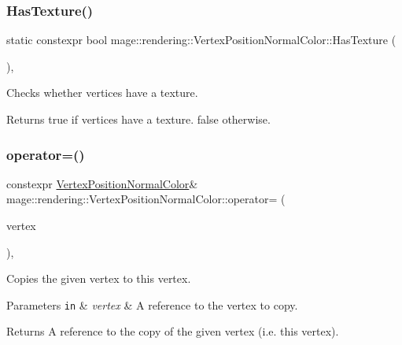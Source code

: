 \subsubsection{\texorpdfstring{Has\+Texture()}{HasTexture()}}
{\footnotesize\ttfamily static constexpr bool mage\+::rendering\+::\+Vertex\+Position\+Normal\+Color\+::\+Has\+Texture (\begin{DoxyParamCaption}{ }\end{DoxyParamCaption})\hspace{0.3cm}{\ttfamily [static]}, {\ttfamily [noexcept]}}

Checks whether vertices have a texture.

\begin{DoxyReturn}{Returns}
{\ttfamily true} if vertices have a texture. {\ttfamily false} otherwise. 
\end{DoxyReturn}
\mbox{\label{structmage_1_1rendering_1_1_vertex_position_normal_color_ae3bdf697f0dae8b01b43c6a8249ee817}} 
\subsubsection{\texorpdfstring{operator=()}{operator=()}\hspace{0.1cm}{\footnotesize\ttfamily [1/2]}}
{\footnotesize\ttfamily constexpr \mbox{\hyperlink{structmage_1_1rendering_1_1_vertex_position_normal_color}{Vertex\+Position\+Normal\+Color}}\& mage\+::rendering\+::\+Vertex\+Position\+Normal\+Color\+::operator= (\begin{DoxyParamCaption}\item[{const \mbox{\hyperlink{structmage_1_1rendering_1_1_vertex_position_normal_color}{Vertex\+Position\+Normal\+Color}} \&}]{vertex }\end{DoxyParamCaption})\hspace{0.3cm}{\ttfamily [default]}, {\ttfamily [noexcept]}}

Copies the given vertex to this vertex.


\begin{DoxyParams}[1]{Parameters}
\mbox{\tt in}  & {\em vertex} & A reference to the vertex to copy. \\
\hline
\end{DoxyParams}
\begin{DoxyReturn}{Returns}
A reference to the copy of the given vertex (i.\+e. this vertex). 
\end{DoxyReturn}
\mbox{\label{structmage_1_1rendering_1_1_vertex_position_normal_color_a2528c797701a7102e6895d5c5d04cf27}} 
